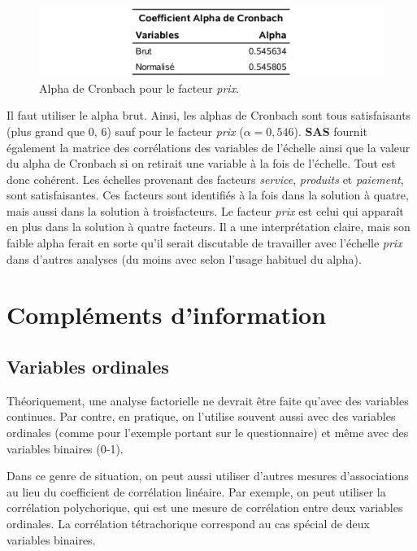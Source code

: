 \documentclass[
]{book}
\theoremstyle{definition}
\theoremstyle{definition}
\theoremstyle{definition}
\theoremstyle{remark}
\begin{document}
\begin{figure}

{\centering \includegraphics[width=0.85\linewidth]{figures/01-facto-e11} 

}

\caption{Alpha de Cronbach pour le facteur \emph{prix}.}\label{fig:fig1p11}
\end{figure}

Il faut utiliser le alpha brut. Ainsi, les alphas de Cronbach sont tous
satisfaisants (plus grand que 0, 6) sauf pour le facteur \emph{prix} (\(\alpha=0, 546\)). \textbf{SAS} fournit également la matrice des corrélations des variables de l'échelle ainsi que la valeur du alpha de Cronbach si on retirait une variable à la fois de l'échelle. Tout est donc cohérent. Les échelles provenant des facteurs \emph{service}, \emph{produits} et \emph{paiement}, sont satisfaisantes. Ces facteurs sont identifiés à la fois dans la solution à quatre, mais aussi dans la solution à troisfacteurs. Le facteur \emph{prix} est celui qui apparaît en plus dans la solution à quatre facteurs. Il a une interprétation claire, mais son faible alpha ferait en sorte qu'il serait discutable de travailler avec l'échelle \emph{prix} dans d'autres analyses (du moins avec selon l'usage habituel du alpha).

\hypertarget{compluxe9ments-dinformation}{%
\section{Compléments d'information}\label{compluxe9ments-dinformation}}

\hypertarget{variables-ordinales}{%
\subsection{Variables ordinales}\label{variables-ordinales}}

Théoriquement, une analyse factorielle ne devrait être faite qu'avec des
variables continues. Par contre, en pratique, on l'utilise souvent aussi avec des variables ordinales (comme pour l'exemple portant sur le questionnaire) et même avec des variables binaires (0-1).

Dans ce genre de situation, on peut aussi utiliser d'autres mesures d'associations au lieu du coefficient de corrélation linéaire. Par exemple, on peut utiliser la corrélation polychorique, qui est une mesure de corrélation entre deux variables ordinales. La corrélation tétrachorique correspond au cas spécial de deux variables binaires.
\end{document}
